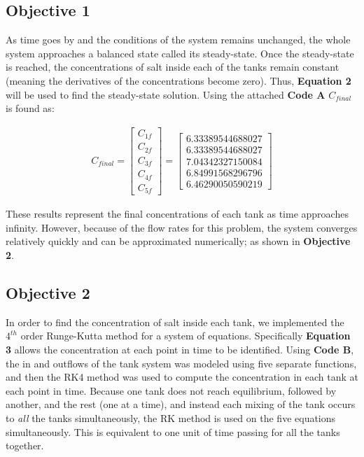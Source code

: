 \documentclass[a4paper, 12pt]{article}
\begin{document}
\subsection{Objective 1}
As time goes by and the conditions of the system remains unchanged, the whole system approaches a balanced state called its steady-state. Once the steady-state is reached, the concentrations of salt inside each of the tanks remain constant (meaning the derivatives of the concentrations become zero). Thus, \textbf{Equation 2} will be used to find the steady-state solution. Using the attached \textbf{Code A} $C_{final}$ is found as:

\begin{align}
	C_{final}=	
	\begin{bmatrix}
		C_{1f}\\C_{2f}\\C_{3f}\\C_{4f}\\C_{5f}
	\end{bmatrix}=
	\begin{bmatrix}
		6.33389544688027\\6.33389544688027\\7.04342327150084\\6.84991568296796\\6.46290050590219
	\end{bmatrix}
\end{align}

These results represent the final concentrations of each tank as time approaches infinity. However, because of the flow rates for this problem, the system converges relatively quickly and can be approximated numerically; as shown in \textbf{Objective 2}.

\subsection{Objective 2}
In order to find the concentration of salt inside each tank, we implemented the $4^{th}$ order Runge-Kutta method for a system of equations. Specifically \textbf{Equation 3} allows the concentration at each point in time to be identified. Using \textbf{Code B}, the in and outflows of the tank system was modeled using five separate functions, and then the RK4 method was used to compute the concentration in each tank at each point in time. Because one tank does not reach equilibrium, followed by another, and the rest (one at a time), and instead each mixing of the tank occurs to \textit{all} the tanks simultaneously, the RK method is used on the five equations simultaneously. This is equivalent to one unit of time passing for all the tanks together.
\end{document}
